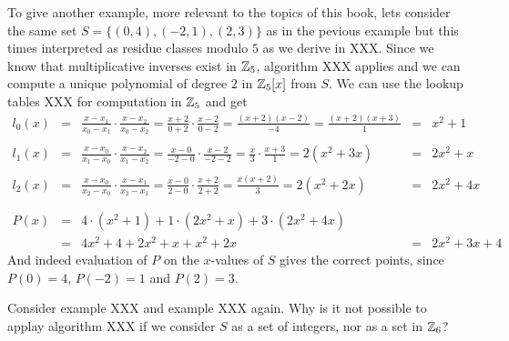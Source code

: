 \begin{example} To give another example, more relevant to the topics of this book, lets consider the same set $S=\{(0,4),(-2,1),(2,3)\}$ as in the pevious example but this times interpreted as residue classes modulo $5$ as we derive in XXX. Since we know
that multiplicative inverses exist in $\mathbb{Z}_5$, algorithm XXX applies and we can compute a unique polynomial of degree 2 in $\mathbb{Z}_5[x]$ from $S$. We can use the lookup tables XXX for computation in $\mathbb{Z}_5$ and get
$$
\begin{array}{lcccl}
l_0(x) & = & \frac{x-x_1}{x_0-x_1}\cdot\frac{x-x_2}{x_0-x_2}
         = \frac{x+2}{0+2}\cdot\frac{x-2}{0-2}
         =  \frac{(x+2)(x-2)}{-4}
         =  \frac{(x+2)(x+3)}{1}
       & = & x^2+1\\
         \\
l_1(x) & = & \frac{x-x_0}{x_1-x_0}\cdot\frac{x-x_2}{x_1-x_2}
         = \frac{x-0}{-2-0}\cdot \frac{x-2}{-2-2}
         = \frac{x}{3}\cdot \frac{x+3}{1}
         = 2(x^2+3x)
       & = & 2x^2+x\\
         \\
l_2(x) & = & \frac{x-x_0}{x_2-x_0}\cdot\frac{x-x_1}{x_2-x_1}
         = \frac{x-0}{2-0}\cdot\frac{x+2}{2+2}
         = \frac{x(x+2)}{3}
         = 2(x^2+2x)
       & = & 2x^2+4x\\
       \\
       \\
P(x)   & = &  4\cdot (x^2+1) + 1\cdot (2x^2+x) + 3\cdot (2x^2+4x) 
       & & \\
       & = & 4x^2+4 + 2x^2 +x + x^2+2x
       & = & 2x^2 +3x +4       
\end{array}
$$
And indeed evaluation of $P$ on the $x$-values of $S$ gives the correct points, since $P(0)=4$, $P(-2)=1$ and $P(2)=3$.
\end{example}

\begin{exercise}
Consider example XXX and example XXX again. Why is it not possible to applay algorithm XXX if we consider $S$ as a set of integers, nor as a set in $\mathbb{Z}_6$?
\end{exercise}



